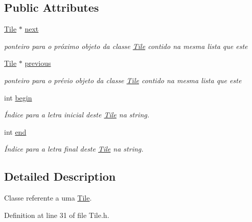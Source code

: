 \subsection*{Public Attributes}
\begin{DoxyCompactItemize}
\item 
\hyperlink{classTile}{Tile} $\ast$ \hyperlink{classTile_a3c9f5e6070368625c8bfc8b9d30282ca}{next}
\begin{DoxyCompactList}\small\item\em ponteiro para o próximo objeto da classe \hyperlink{classTile}{Tile} contido na mesma lista que este \end{DoxyCompactList}\item 
\hyperlink{classTile}{Tile} $\ast$ \hyperlink{classTile_ac5e5e631733d14196575bd39d5df8923}{previous}
\begin{DoxyCompactList}\small\item\em ponteiro para o prévio objeto da classe \hyperlink{classTile}{Tile} contido na mesma lista que este \end{DoxyCompactList}\item 
int \hyperlink{classTile_abf2eb9ed61ada2b1a35386e5f20bd350}{begin}
\begin{DoxyCompactList}\small\item\em Índice para a letra inicial deste \hyperlink{classTile}{Tile} na string. \end{DoxyCompactList}\item 
int \hyperlink{classTile_a39ee840ddb65bf9ad1fb12667e92993c}{end}
\begin{DoxyCompactList}\small\item\em Índice para a letra final deste \hyperlink{classTile}{Tile} na string. \end{DoxyCompactList}\end{DoxyCompactItemize}


\subsection{Detailed Description}
Classe referente a uma \hyperlink{classTile}{Tile}. 

Definition at line 31 of file Tile.\+h.



